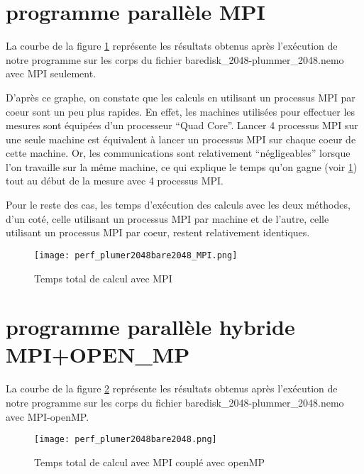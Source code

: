 \section{programme parallèle MPI}

La courbe de la figure \ref{fig:perf_plumer2048bare2048_MPI} représente les résultats obtenus après l'exécution de notre programme sur les corps du fichier baredisk\_2048-plummer\_2048.nemo avec MPI seulement.

\par D'après ce graphe, on constate que les calculs en utilisant un processus MPI par coeur sont un peu plus rapides. En effet, les machines utilisées pour effectuer les mesures sont équipées d'un processeur ``Quad Core''. Lancer 4 processus MPI sur une seule machine est équivalent à lancer un processus MPI sur chaque coeur de cette machine. Or, les communications sont relativement ``négligeables'' lorsque l'on travaille sur la même machine, ce qui explique le temps qu'on gagne (voir \ref{fig:perf_plumer2048bare2048_MPI}) tout au début de la mesure avec 4 processus MPI.

\par Pour le reste des cas, les temps d'exécution des calculs avec les deux méthodes, d'un coté, celle utilisant un processus MPI par machine et de l'autre, celle utilisant un processus MPI par coeur, restent relativement identiques.

\begin{figure}[htbp]
  \centering
  \texttt{[image: perf\_plumer2048bare2048\_MPI.png]}
  \caption{Temps total de calcul avec MPI}
  \label{fig:perf_plumer2048bare2048_MPI}
\end{figure}

\section{programme parallèle hybride MPI+OPEN\_MP}
La courbe de la figure \ref{fig:perf_plumer2048bare2048} représente les résultats obtenus après l'exécution de notre programme sur les corps du fichier baredisk\_2048-plummer\_2048.nemo avec MPI-openMP.

\begin{figure}[htbp]
  \centering
  \texttt{[image: perf\_plumer2048bare2048.png]}
 \caption{Temps total de calcul avec MPI couplé avec openMP}
\label{fig:perf_plumer2048bare2048}
\end{figure}
